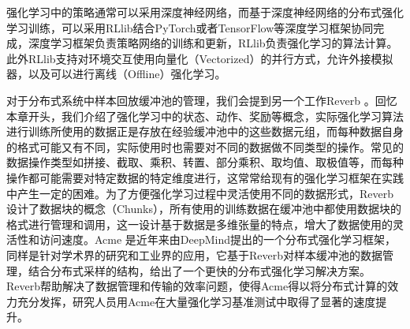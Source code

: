 \documentclass[letterpaper,10pt,english]{sphinxmanual}
\begin{document}
\sphinxAtStartPar
强化学习中的策略通常可以采用深度神经网络，而基于深度神经网络的分布式强化学习训练，可以采用RLlib结合PyTorch或者TensorFlow等深度学习框架协同完成，深度学习框架负责策略网络的训练和更新，RLlib负责强化学习的算法计算。此外RLlib支持对环境交互使用向量化（Vectorized）的并行方式，允许外接模拟器，以及可以进行离线（Offline）强化学习。

\sphinxAtStartPar
对于分布式系统中样本回放缓冲池的管理，我们会提到另一个工作Reverb
。回忆本章开头，我们介绍了强化学习中的状态、动作、奖励等概念，实际强化学习算法进行训练所使用的数据正是存放在经验缓冲池中的这些数据元组，而每种数据自身的格式可能又有不同，实际使用时也需要对不同的数据做不同类型的操作。常见的数据操作类型如拼接、截取、乘积、转置、部分乘积、取均值、取极值等，而每种操作都可能需要对特定数据的特定维度进行，这常常给现有的强化学习框架在实践中产生一定的困难。为了方便强化学习过程中灵活使用不同的数据形式，Reverb设计了数据块的概念（Chunks），所有使用的训练数据在缓冲池中都使用数据块的格式进行管理和调用，这一设计基于数据是多维张量的特点，增大了数据使用的灵活性和访问速度。Acme
是近年来由DeepMind提出的一个分布式强化学习框架，同样是针对学术界的研究和工业界的应用，它基于Reverb对样本缓冲池的数据管理，结合分布式采样的结构，给出了一个更快的分布式强化学习解决方案。Reverb帮助解决了数据管理和传输的效率问题，使得Acme得以将分布式计算的效力充分发挥，研究人员用Acme在大量强化学习基准测试中取得了显著的速度提升。
\end{document}
